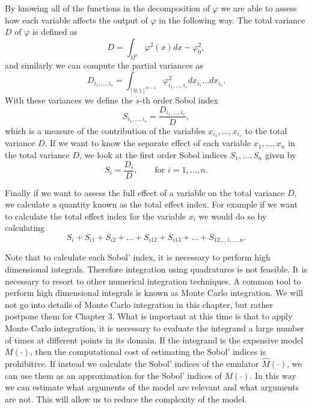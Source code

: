 \documentclass{sfuthesis}
\begin{document}
By knowing all of
the functions in the decomposition of $\varphi$ we are able  to assess how each variable 
affects the output of $\varphi$ in the following way. The total variance $D$ of $\varphi$ is defined as
\begin{equation*}
D=\int_{\Omega^{n}}\varphi^{2}(x)dx-\varphi_{0}^{2},
\end{equation*}
and similarly we can compute the partial variances as
\begin{equation*}
D_{i_{1},\ldots,i_{s}}=\int_{[0,1]^{n-1}}\varphi^{2}_{i_{1},\ldots,i_{s}}dx_{i_{1}}\ldots dx_{i_{s}}.
\end{equation*}
With these variances we define the $s$-th order  Sobol index  
\begin{equation*} 
S_{i_{1},\ldots,i_{s}}=\frac{D_{i_{1},\ldots,i_{s}}}{D},
\end{equation*}
which is a measure of the contribution of the variables $x_{i_{1}},\ldots,x_{i_{s}}$ to the total variance $D$.
If we want to know the separate effect  of each variable
$x_{1},\ldots,x_{n}$ in the total variance $D$, we look at
the first order Sobol indices $S_{1},\ldots,S_{n}$ given by
\begin{equation*}
S_{i}=\frac{D_{i}}{D},\qquad\text{for }i=1,\ldots,n.
\end{equation*}

Finally if we want to assess the full effect of a  variable  on the total variance $D$, 
we calculate a quantity known 
as the total effect index. For example if we want to calculate the total effect index
for the variable $x_{i}$ we would do so by calculating
\begin{equation*}
S_{i}+S_{i1}+S_{i2}+\ldots+S_{i12}+S_{i13}+\ldots+S_{12\ldots,i,\ldots, n}.
\end{equation*}

Note that  to calculate each  Sobol' index, it is necessary to perform 
high dimensional integrals. Therefore integration using quadratures is not feasible.
It is necessary to resort to other numerical integration techniques. A common
tool to perform high dimensional integrals is known as Monte Carlo integration. We will not
go into details of Monte Carlo integration in this chapter, but rather postpone them for Chapter 3.
What is important at this time is that to apply Monte Carlo integration, it is necessary to 
evaluate the integrand a large number of times at different points in its domain. If the 
integrand is the expensive model $M(\cdot)$, then the computational cost of estimating
the Sobol' indices is prohibitive. If instead we calculate the Sobol' indices 
of the emulator $\widehat{M}(\cdot)$, we can use them as an approximation for the Sobol'
indices of $M(\cdot)$. In this way we can estimate what arguments of the model are 
relevant and what arguments are not. This will allow us to reduce the complexity of the
model.
\end{document}
